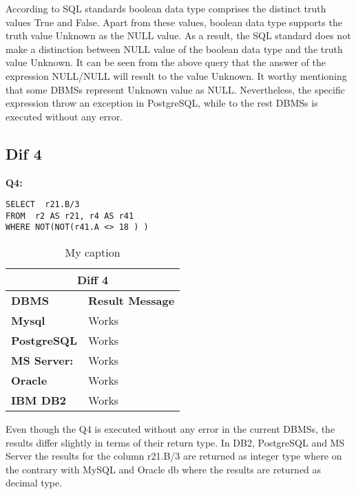 According to SQL standards boolean data type comprises the distinct truth values True and False. Apart from these values, boolean data type supports the truth value Unknown as the NULL value. As a result, the SQL standard does not make a distinction between NULL value of the boolean data type and the truth value Unknown. It can be seen from the above query that the answer of  the expression NULL/NULL will result to the value Unknown. It worthy mentioning that some DBMSs represent Unknown value as NULL. Nevertheless, the specific expression throw an exception in PostgreSQL, while to the rest DBMSs is executed without any error. 

\subsection{Dif 4}
  
\begin{mdframed}[backgroundcolor=lightgray!20] 
\textbf{Q4:}
\begin{lstlisting}
SELECT  r21.B/3
FROM  r2 AS r21, r4 AS r41
WHERE NOT(NOT(r41.A <> 18 ) )  
\end{lstlisting}
\end{mdframed}

 
\begin{table}[h]
\centering
\caption{My caption}
\label{my-label}
\begin{tabular}{|p{2cm}|p{12cm}|}
\hline
\multicolumn{2}{|c|}{\textbf{Diff 4}}                                     \\ \hline
\textbf{DBMS}                              & \textbf{Result Message}      \\ \hline
{\color[HTML]{333333} \textbf{Mysql}}      & {\color[HTML]{333333} Works} \\ \hline
{\color[HTML]{333333} \textbf{PostgreSQL}} & {\color[HTML]{333333} Works} \\ \hline
{\color[HTML]{333333} \textbf{MS Server:}} & {\color[HTML]{333333} Works} \\ \hline
\textbf{Oracle}                            & Works                        \\ \hline
\textbf{IBM DB2}                           & Works                        \\ \hline
\end{tabular}
\end{table}

Even though the Q4 is executed without any error in the current DBMSs, the results differ slightly in terms of their return type. In DB2, PostgreSQL and MS Server the results for the column  r21.B/3  are returned as integer type where on the contrary with MySQL and Oracle db where the results are returned as decimal type. 

